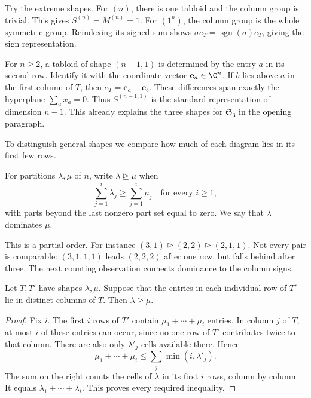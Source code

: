 Try the extreme shapes. For $(n)$, there is one tabloid and the column group is trivial. This gives $S^{(n)}=M^{(n)}=1$. For $(1^n)$, the column group is the whole symmetric group. Reindexing its signed sum shows $\sigma e_T=\operatorname{sgn}(\sigma)e_T$, giving the sign representation.

For $n\ge2$, a tabloid of shape $(n-1,1)$ is determined by the entry $a$ in its second row. Identify it with the coordinate vector $\mathbf e_a\in\C^n$. If $b$ lies above $a$ in the first column of $T$, then
$e_T=\mathbf e_a-\mathbf e_b$.
These differences span exactly the hyperplane $\sum_ax_a=0$. Thus $S^{(n-1,1)}$ is the standard representation of dimension $n-1$. This already explains the three shapes for $\mathfrak S_3$ in the opening paragraph.

To distinguish general shapes we compare how much of each diagram lies in its first few rows.

\begin{definition}\label{def:dominance}
For partitions $\lambda,\mu$ of $n$, write $\lambda\trianglerighteq\mu$ when
\[
\sum_{j=1}^i\lambda_j\ge\sum_{j=1}^i\mu_j
\quad\text{for every }i\ge1,
\]
with parts beyond the last nonzero part set equal to zero. We say that $\lambda$ dominates $\mu$.
\end{definition}

This is a partial order. For instance $(3,1)\trianglerighteq(2,2)\trianglerighteq(2,1,1)$. Not every pair is comparable: $(3,1,1,1)$ leads $(2,2,2)$ after one row, but falls behind after three. The next counting observation connects dominance to the column signs.

\begin{lemma}\label{lem:dominance}
Let $T,T'$ have shapes $\lambda,\mu$. Suppose that the entries in each individual row of $T'$ lie in distinct columns of $T$. Then $\lambda\trianglerighteq\mu$.
\end{lemma}

\begin{proof}
Fix $i$. The first $i$ rows of $T'$ contain $\mu_1+\cdots+\mu_i$ entries. In column $j$ of $T$, at most $i$ of these entries can occur, since no one row of $T'$ contributes twice to that column. There are also only $\lambda'_j$ cells available there. Hence
\[
\mu_1+\cdots+\mu_i\le\sum_j\min(i,\lambda'_j).
\]
The sum on the right counts the cells of $\lambda$ in its first $i$ rows, column by column. It equals $\lambda_1+\cdots+\lambda_i$. This proves every required inequality.
\end{proof}

